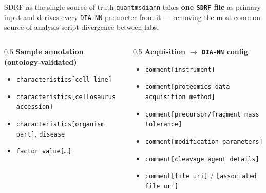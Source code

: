 \documentclass[aspectratio=169,11pt]{beamer}
\newcommand{\quantmsdiann}{\textcolor{qmblue}{\texttt{quantmsdiann}}}
\newcommand{\diann}{\texttt{DIA-NN}}
\newcommand{\sdrf}{\texttt{SDRF}}
\begin{document}
\begin{frame}{SDRF as the single source of truth}
  \quantmsdiann{} takes \textbf{one \sdrf{} file} as primary input and derives
  every \diann{} parameter from it --- removing the most common source of
  analysis-script divergence between labs.
  \vspace{0.5em}
  \begin{columns}[T]
    \begin{column}{0.5\textwidth}
      \textbf{Sample annotation (ontology-validated)}
      \begin{itemize}\small
        \item \texttt{characteristics[cell line]}
        \item \texttt{characteristics[cellosaurus accession]}
        \item \texttt{characteristics[organism part]}, \texttt{disease}
        \item \texttt{factor value[\ldots]}
      \end{itemize}
    \end{column}
    \begin{column}{0.5\textwidth}
      \textbf{Acquisition $\rightarrow$ \diann{} config}
      \begin{itemize}\small
        \item \texttt{comment[instrument]}
        \item \texttt{comment[proteomics data acquisition method]}
        \item \texttt{comment[precursor/fragment mass tolerance]}
        \item \texttt{comment[modification parameters]}
        \item \texttt{comment[cleavage agent details]}
        \item \texttt{comment[file uri]} / \texttt{[associated file uri]}
      \end{itemize}
    \end{column}
  \end{columns}
\end{frame}
\end{document}
